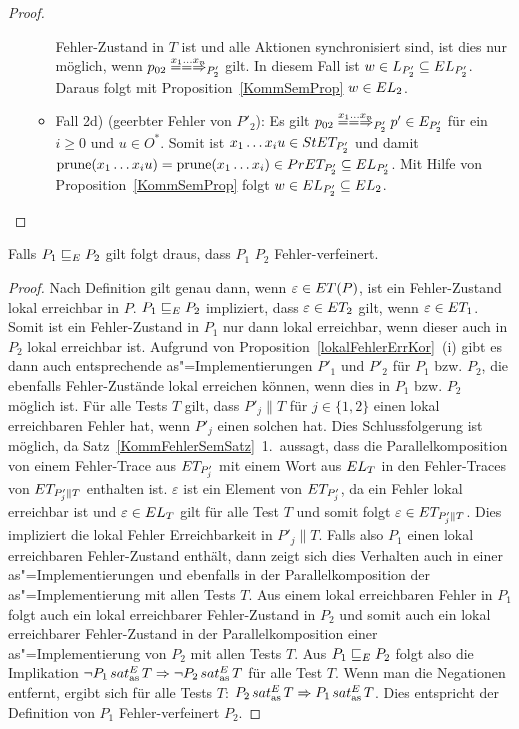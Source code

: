 \begin{proof}
\begin{itemize}
\begin{itemize}
          Fehler-Zustand in $T$ ist und alle Aktionen synchronisiert sind, ist
          dies nur möglich, wenn $p_{02} \lweakmay[x_1\dots x_n]_{P'_2}$ gilt.
          In diesem Fall ist $w\in L_{P'_2}\subseteq EL _{P'_2}$. Daraus
          folgt mit Proposition~\ref{KommSemProp} $w\in EL _2$.
        \item Fall 2d) (geerbter Fehler von $P'_2$): Es gilt $p_{02}
          \lweakmay[x_1\dots x_n]_{P'_2} p'\in E_{P'_2}$ für ein $i\geq 0$ und
          $u\in O^*$. Somit ist $x_1\dots x_i u\in StET _{P'_2}$ und damit
          $\mathrm{prune} (x_1\dots x_iu) =\mathrm{prune} (x_1\dots x_i)\in PrET
          _{P'_2}\subseteq EL _{P'_2}$. Mit Hilfe von
          Proposition~\ref{KommSemProp} folgt $w\in EL _{P'_2}\subseteq EL
          _2$.
      \end{itemize}
  \end{itemize}
\end{proof}

\begin{Satz}
  \label{KommTestVerfSatz}
  Falls $P_1 \sqsubseteq  _E P_2$ gilt folgt draus, dass $P_1$ $P_2$
  Fehler-verfeinert.
\end{Satz}
\begin{proof}
  Nach Definition gilt genau dann, wenn $\varepsilon\in ET (P)$, ist ein
  Fehler-Zustand lokal erreichbar in $P$. $P_1 \sqsubseteq  _E P_2$ impliziert, dass
  $\varepsilon\in ET _2$ gilt, wenn $\varepsilon\in ET _1$. Somit ist ein
  Fehler-Zustand in $P_1$ nur dann lokal erreichbar, wenn dieser auch in $P_2$
  lokal erreichbar ist. Aufgrund von Proposition~\ref{lokalFehlerErrKor}~(i)
  gibt es dann auch entsprechende as"=Implementierungen $P'_1$ und $P'_2$ für
  $P_1$ bzw. $P_2$, die ebenfalls Fehler-Zustände lokal erreichen können, wenn
  dies in $P_1$ bzw. $P_2$ möglich ist. Für alle Tests $T$ gilt, dass $P'_j\|T$
  für $j\in\{1,2\}$ einen lokal erreichbaren Fehler hat, wenn $P'_j$ einen
  solchen hat. Dies Schlussfolgerung ist möglich, da
  Satz~\ref{KommFehlerSemSatz}~1.\ aussagt, dass die Parallelkomposition von
  einem Fehler-Trace aus $ET _{P'_j}$ mit einem Wort aus $EL _T$ in den
  Fehler-Traces von $ET _{P'_j\|T}$ enthalten ist. $\varepsilon$ ist ein
  Element von $ET _{P'_j}$, da ein Fehler lokal erreichbar ist und
  $\varepsilon \in EL _T$ gilt  für alle Test $T$ und somit folgt $\varepsilon
  \in ET _{P'_j\|T}$. Dies impliziert die lokal Fehler Erreichbarkeit in
  $P'_j\|T$. Falls also $P_1$ einen lokal erreichbaren Fehler-Zustand enthält,
  dann zeigt sich dies Verhalten auch in einer as"=Implementierungen und
  ebenfalls in der Parallelkomposition der as"=Implementierung mit allen Tests
  $T$. Aus einem lokal erreichbaren Fehler in $P_1$ folgt auch ein lokal
  erreichbarer Fehler-Zustand in $P_2$ und somit auch ein lokal erreichbarer
  Fehler-Zustand in der Parallelkomposition einer as"=Implementierung von $P_2$
  mit allen Tests $T$. Aus $P_1 \sqsubseteq  _E P_2$ folgt also die Implikation $\neg P_1
  \hspace{0.05cm}sat_\mathrm{as}^E\hspace{0.05cm} T \Rightarrow \neg P_2 \hspace{0.05cm}sat_\mathrm{as}^E\hspace{0.05cm} T$ für alle Test $T$. Wenn man die
  Negationen entfernt, ergibt sich für alle Tests $T$: $P_2\hspace{0.05cm}sat_\mathrm{as}^E\hspace{0.05cm} T\Rightarrow
  P_1\hspace{0.05cm}sat_\mathrm{as}^E\hspace{0.05cm} T$. Dies entspricht der Definition von $P_1$ Fehler-verfeinert
  $P_2$.
\end{proof}

